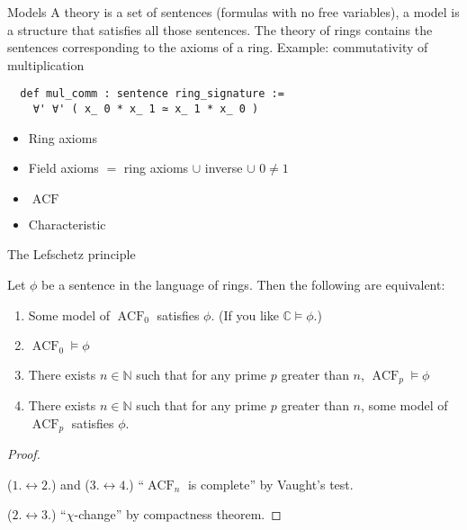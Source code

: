 \documentclass[10pt]{beamer}
\newcommand{\IFF}{\leftrightarrow}
\newcommand{\N}{\mathbb{N}}
\newcommand{\C}{\mathbb{C}}
\newcommand{\<}{\langle}
\renewcommand{\>}{\rangle}
\DeclareMathOperator{\ACF}{ACF}
\newcommand{\link}[1]{\hypertarget{#1}{}}
\begin{document}
\begin{frame}[fragile]{Models}
  A theory is a set of sentences (formulas with no free variables),
  a model is a structure that satisfies all those sentences. \pause
  The theory of rings contains the sentences corresponding to
  the axioms of a ring. \pause Example: commutativity of multiplication
  \begin{lstlisting}
  def mul_comm : sentence ring_signature :=
    ∀' ∀' ( x_ 0 * x_ 1 ≃ x_ 1 * x_ 0 ) \end{lstlisting} \pause
  \begin{itemize}
    \item Ring axioms
    \item Field axioms $=$ ring axioms $\cup$ inverse $\cup$ $0 \ne 1$
    \item $\ACF$
    \item Characteristic
  \end{itemize} \pause
\end{frame}

\begin{frame}[fragile]{The Lefschetz principle}
  \begin{theorem}
    \link{lefschetz2}
    Let $\phi$ be a sentence in the language of rings. %
    Then the following are equivalent:
    \begin{enumerate}
        \item Some model of $\ACF_0$ satisfies $\phi$.
        (If you like $\C \vDash \phi$.)
        \item $\ACF_0 \vDash \phi$
        \item There exists $n \in \N$ such that for any prime $p$
            greater than $n$, $\ACF_p \vDash \phi$
        \item There exists $n \in \N$ such that for any prime $p$
        greater than $n$, some model of $\ACF_p$ satisfies $\phi$.
    \end{enumerate} \pause
    \begin{proof}
      \link{lefschetz_proof}
      ($1. \IFF 2.$) and ($3. \IFF 4.$) ``$\ACF_{n}$ is complete''
      by Vaught's test. \pause

      ($2. \IFF 3.$) ``$\chi$-change'' by compactness theorem.
    \end{proof}
\end{theorem}
\end{frame}
\end{document}
